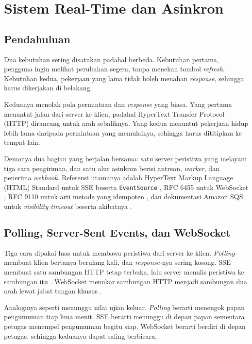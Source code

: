 \chapter{Sistem Real-Time dan Asinkron}
\label{ch:realtime}

\section{Pendahuluan}

Dua kebutuhan sering disatukan padahal berbeda. Kebutuhan pertama, pengguna
ingin melihat perubahan segera, tanpa menekan tombol \textit{refresh}.
Kebutuhan kedua, pekerjaan yang lama tidak boleh menahan \textit{response}, sehingga
harus dikerjakan di belakang.

Keduanya menolak pola permintaan dan \textit{response} yang biasa. Yang pertama
menuntut jalan dari server ke klien, padahal HyperText Transfer Protocol (HTTP) dirancang untuk arah
sebaliknya. Yang kedua menuntut pekerjaan hidup lebih lama daripada
permintaan yang memulainya, sehingga harus dititipkan ke tempat lain.

Demonya dua bagian yang berjalan bersama: satu server peristiwa yang
melayani tiga cara pengiriman, dan satu alur asinkron berisi antrean,
\textit{worker}, dan penerima \textit{webhook}. Referensi utamanya adalah
HyperText Markup Language (HTML) Standard untuk SSE beserta \texttt{EventSource} \cite{whatwg-html}, RFC
6455 untuk WebSocket \cite{rfc6455}, RFC 9110 untuk arti metode yang
idempoten \cite{rfc9110}, dan dokumentasi Amazon SQS untuk
\textit{visibility timeout} beserta akibatnya \cite{aws-sqs-visibility}.

\section{Polling, Server-Sent Events, dan WebSocket}

Tiga cara dipakai luas untuk membawa peristiwa dari server ke klien.
\textit{Polling} membuat klien bertanya berulang kali, dan \textit{response}-nya sering
kosong. SSE membuat satu sambungan HTTP tetap terbuka, lalu server menulis
peristiwa ke sambungan itu \cite{whatwg-html}. WebSocket menukar sambungan
HTTP menjadi sambungan dua arah lewat jabat tangan khusus \cite{rfc6455}.

Analoginya seperti menunggu nilai ujian keluar. \textit{Polling} berarti
menengok papan pengumuman tiap lima menit. SSE berarti menunggu di depan
papan sementara petugas menempel pengumuman begitu siap. WebSocket berarti
berdiri di depan petugas, sehingga keduanya dapat saling berbicara.

